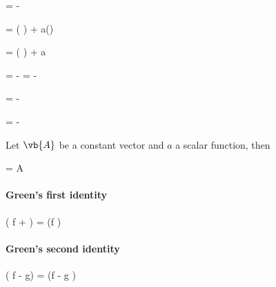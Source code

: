 \documentclass[oneside, 12pt]{book}
\begin{document}
\beq[eq:curlcurl]  =  - \eeq

\beq[eq:divaV]  = \left( \right)\cdot{} + a\left(\right)\eeq

\beq[eq:curlaV]  = \left( \right)\cross {} + a \eeq

\beq[eq:grad1r]  = - = -\eeq

\beq[eq:gradxx']  = -\eeq

\beq[eq:divxx'] \gradi[x] = -\gradi[x']\eeq

Let \(\vb{A}\) be a constant vector and \(a\) a scalar function, then

\beq[eq:curlAa]  = \cross A \eeq

\paragraph{Green's first identity}
\beq[eq:greensidentity1] \left( f + \cdot{}\right) = \cdot\left(f \right) \eeq

\paragraph{Green's second identity}
\beq[eq:greensidentity2]  \left( f - g\right) =  \cdot \left(f - g \right) \eeq
\end{document}

